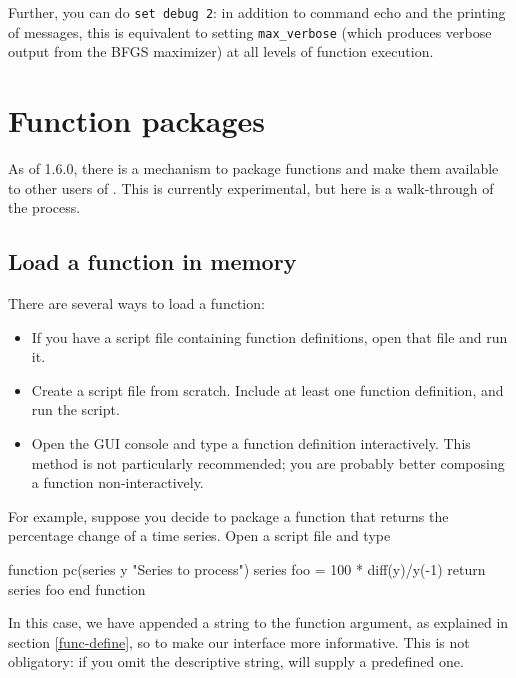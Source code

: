 Further, you can do \texttt{set debug 2}: in addition to command echo
and the printing of messages, this is equivalent to setting
\verb|max_verbose| (which produces verbose output from the BFGS
maximizer) at all levels of function execution.


\section{Function packages}
\label{sec:func-packages}

As of  1.6.0, there is a mechanism to package functions and
make them available to other users of .  This is currently
experimental, but here is a walk-through of the process.

\subsection{Load a function in memory}

There are several ways to load a function:

\begin{itemize}
\item If you have a script file containing function definitions, open
  that file and run it.
\item Create a script file from scratch.  Include at least one
  function definition, and run the script.
\item Open the GUI console and type a function definition
  interactively.  This method is not particularly recommended; you are
  probably better composing a function non-interactively.
\end{itemize}

For example, suppose you decide to package a function that returns the
percentage change of a time series. Open a script file and type
\begin{code}
function pc(series y "Series to process")
  series foo = 100 * diff(y)/y(-1)
  return series foo
end function
\end{code}
In this case, we have appended a string to the function
argument, as explained in section \ref{func-define}, so to make our
interface more informative. This is not obligatory: if you omit the
descriptive string,  will supply a predefined one.

